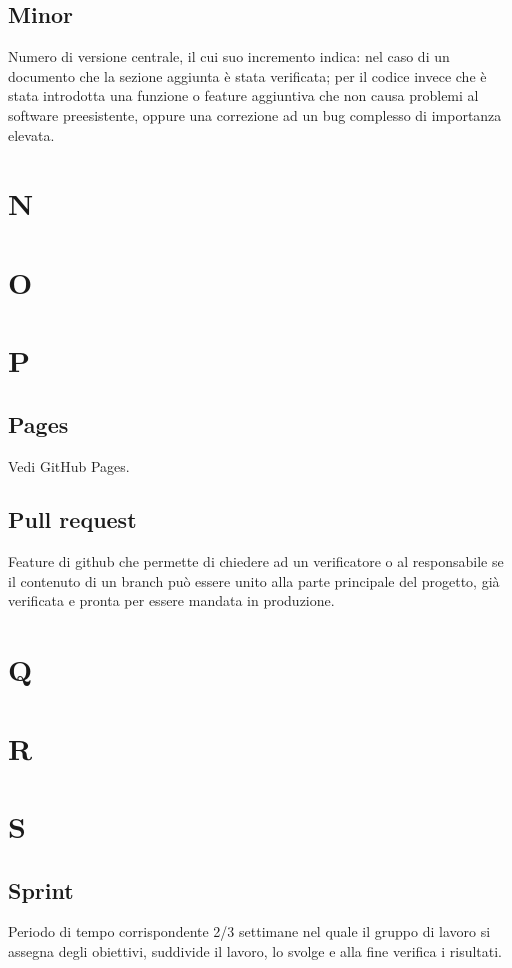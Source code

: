     \subsection{Minor}
    Numero di versione centrale, il cui suo incremento indica: nel caso di un documento che la sezione aggiunta è stata verificata; per il codice invece che è stata
    introdotta una funzione o feature aggiuntiva che non causa problemi al software preesistente, oppure una correzione ad un bug complesso di importanza elevata.

\section{N}
\section{O}
\section{P}
    \subsection{Pages}
    Vedi GitHub Pages.
    \subsection{Pull request}
    Feature di github che permette di chiedere ad un verificatore o al responsabile se il contenuto di un branch può
    essere unito alla parte principale del progetto, già verificata e pronta per essere mandata in produzione.

\section{Q}
\section{R}
\section{S}
    \subsection{Sprint}
    Periodo di tempo corrispondente 2/3 settimane nel quale il gruppo di lavoro si assegna degli 
    obiettivi, suddivide il lavoro, lo svolge e alla fine verifica i risultati.
